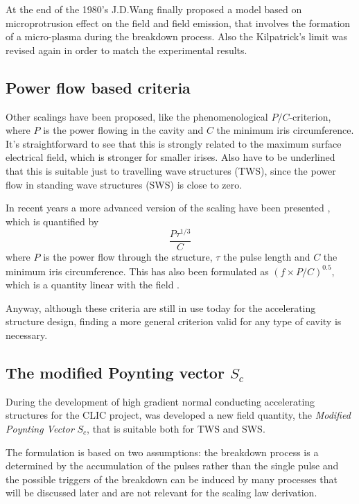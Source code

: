 At the end of the 1980's J.D.Wang finally proposed a model based on microprotrusion effect on the field and field emission, that involves the formation of a micro-plasma during the breakdown process. Also the Kilpatrick's limit was revised again in order to match the experimental results. \cite{Wang:1986, kilp:story}


\subsection[Power flow based criteria]{Power flow based criteria}

Other scalings have been proposed, like the phenomenological $P/C$-criterion, where $P$ is the power flowing in the cavity and $C$ the minimum iris circumference. It's straightforward to see that this is strongly related to the maximum surface electrical field, which is stronger for smaller irises. Also have to be underlined that this is suitable just to travelling wave structures (TWS), since the power flow in standing wave structures (SWS) is close to zero. 

In recent years a more advanced version of the scaling have been presented \cite{Wuensch:932674}, which is quantified by
\begin{equation}
\frac{P \tau^{1/3}}{C}
\end{equation}
where $P$ is the power flow through the structure, $\tau$ the pulse length and $C$ the minimum iris circumference. This has also been formulated as $(f \times P/C )^{0.5}$, which is a quantity linear with the field \cite{Wuensch:1004189}.

Anyway, although these criteria are still in use today for the accelerating structure design, finding a more general criterion valid for any type of cavity is necessary.

\subsection{The modified Poynting vector $S_c$}

During the development of high gradient normal conducting accelerating structures for the CLIC project, was developed a new field quantity, the \textit{Modified Poynting Vector} $S_c$, that is suitable both for TWS and SWS. \cite{Grudiev:newLoc}

The formulation is based on two assumptions: the breakdown process is a determined by the accumulation of the pulses rather than the single pulse and the possible triggers of the breakdown can be induced by many processes that will be discussed later and are not relevant for the scaling law derivation.

